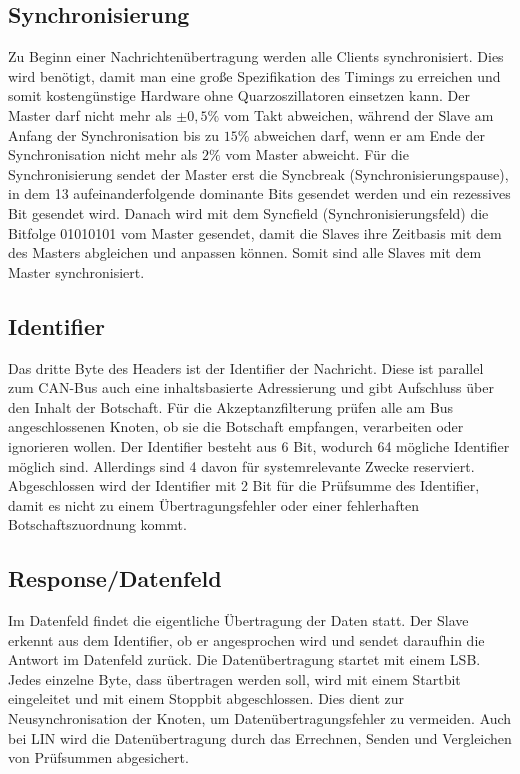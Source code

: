     \subsection{Synchronisierung}
    Zu Beginn einer Nachrichtenübertragung werden alle Clients synchronisiert. Dies wird benötigt, damit man eine große Spezifikation des Timings zu erreichen und somit kostengünstige Hardware ohne Quarzoszillatoren einsetzen kann.
    Der Master darf nicht mehr als $\pm 0,5\%$ vom Takt abweichen, während der Slave am Anfang der Synchronisation bis zu $15\%$ abweichen darf, wenn er am Ende der Synchronisation nicht mehr als $2\%$ vom Master abweicht.
    Für die Synchronisierung sendet der Master erst die Syncbreak (Synchronisierungspause), in dem 13 aufeinanderfolgende dominante Bits gesendet werden und ein rezessives Bit gesendet wird.
    Danach wird mit dem Syncfield (Synchronisierungsfeld) die Bitfolge 01010101 vom Master gesendet, damit die Slaves ihre Zeitbasis mit dem des Masters abgleichen und anpassen können.
    Somit sind alle Slaves mit dem Master synchronisiert.
    
    \subsection{Identifier}
    Das dritte Byte des Headers ist der Identifier der Nachricht.
    Diese ist parallel zum CAN-Bus auch eine inhaltsbasierte Adressierung und gibt Aufschluss über den Inhalt der Botschaft.
    Für die Akzeptanzfilterung prüfen alle am Bus angeschlossenen Knoten, ob sie die Botschaft empfangen, verarbeiten oder ignorieren wollen.
    Der Identifier besteht aus 6 Bit, wodurch 64 mögliche Identifier möglich sind.
    Allerdings sind 4 davon für systemrelevante Zwecke reserviert.
    Abgeschlossen wird der Identifier mit 2 Bit für die Prüfsumme des Identifier, damit es nicht zu einem Übertragungsfehler oder einer fehlerhaften Botschaftszuordnung kommt.
    
    \subsection{Response/Datenfeld}
    Im Datenfeld findet die eigentliche Übertragung der Daten statt.
    Der Slave erkennt aus dem Identifier, ob er angesprochen wird und sendet daraufhin die Antwort im Datenfeld zurück.
    Die Datenübertragung startet mit einem \ac{LSB}.
    Jedes einzelne Byte, dass übertragen werden soll, wird mit einem Startbit eingeleitet und mit einem Stoppbit abgeschlossen.
    Dies dient zur Neusynchronisation der Knoten, um Datenübertragungsfehler zu vermeiden.
    Auch bei \ac{LIN} wird die Datenübertragung durch das Errechnen, Senden und Vergleichen von Prüfsummen abgesichert. 
    
